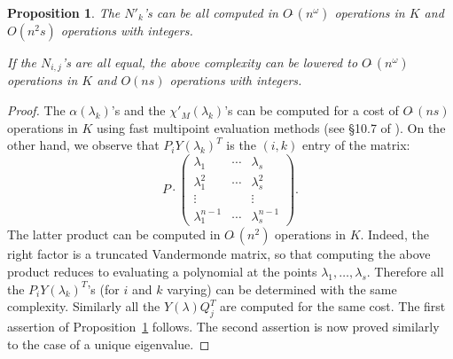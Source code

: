 \documentclass[sigconf]{acmart}
\newcommand{\softO}{O\tilde{~}}
\newtheorem{prop}[theo]{Proposition}
\theoremstyle{definition}
\begin{document}
\begin{prop}
\label{prop:opteigenvalues}
The $N'_k$'s can be all computed in $\softO(n^\omega)$ operations
in $K$ and $O(n^2 s)$ operations with integers.

If the $N_{i,j}$'s are all equal, the above complexity can be 
lowered to $\softO(n^\omega)$ operations in $K$ and $O(n s)$ operations 
with integers.
\end{prop}

\begin{proof}
The $\alpha(\lambda_k)$'s and the $\chi'_M(\lambda_k)$'s can be computed 
for a cost of $\softO(ns)$ operations in $K$ using fast multipoint 
evaluation methods (see \S 10.7 of \cite{gathen-gerhard:13a}).
On the other hand, we observe that $P_i Y(\lambda_k)^T$ is
the $(i,k)$ entry of the matrix:
$$P \cdot \left( \begin{matrix}
\lambda_1 & \cdots & \lambda_s \\
\lambda_1^2 & \cdots & \lambda_s^2 \\
\vdots & & \vdots \\
\lambda_1^{n-1} & \cdots & \lambda_s^{n-1}
\end{matrix} \right).$$
The latter product can be computed in $\softO(n^2)$ operations in 
$K$. Indeed,
the right factor is a truncated Vandermonde matrix, so that
computing the above product reduces to evaluating a polynomial at the
points $\lambda_1, \ldots, \lambda_s$. Therefore all the $P_i 
Y(\lambda_k)^T$'s (for $i$ and $k$ varying) 
can be determined with the same complexity. 
Similarly all the $Y(\lambda) Q_j^T$ are computed for the same cost.
The first assertion of Proposition~\ref{prop:opteigenvalues} follows.
The second assertion is now proved similarly to the case of a unique
eigenvalue.
\end{proof}



\end{document}
